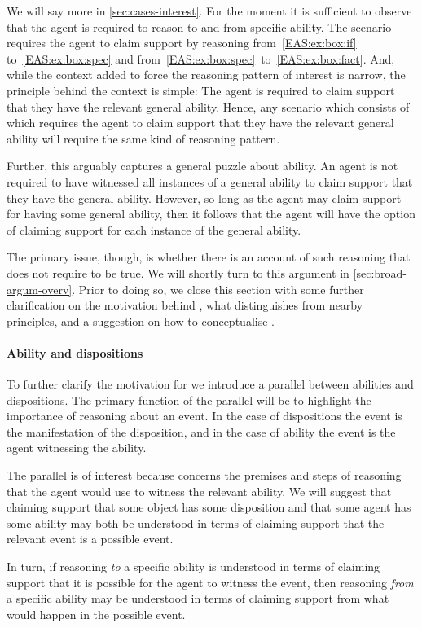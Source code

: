 \begin{note}[Point]
  We will say more in \autoref{sec:cases-interest}.
  For the moment it is sufficient to observe that the agent is required to reason to and from specific ability.
  The scenario requires the agent to claim support by reasoning from~\ref{EAS:ex:box:if} to~\ref{EAS:ex:box:spec} and from~\ref{EAS:ex:box:spec}~to~\ref{EAS:ex:box:fact}.
  And, while the context added to force the reasoning pattern of interest is narrow, the principle behind the context is simple:
  The agent is required to claim support that they have the relevant general ability.
  Hence, any scenario which consists of \gsi{-} which requires the agent to claim support that they have the relevant general ability will require the same kind of reasoning pattern.

  Further, this arguably captures a general puzzle about ability.
  An agent is not required to have witnessed all instances of a general ability to claim support that they have the general ability.
  However, so long as the agent may claim support for having some general ability, then it follows that the agent will have the option of claiming support for each instance of the general ability.

  The primary issue, though, is whether there is an account of such reasoning that does not require \EAS{} to be true.
  We will shortly turn to this argument in \autoref{sec:broad-argum-overv}.
  Prior to doing so, we close this section with some further clarification on the motivation behind \EAS{}, what distinguishes \EAS{} from nearby principles, and a suggestion on how to conceptualise \EAS{}.
\end{note}

\paragraph{Ability and dispositions}

\begin{note}[Parallel]
  To further clarify the motivation for \EAS{} we introduce a parallel between abilities and dispositions.
  The primary function of the parallel will be to highlight the importance of reasoning about an event.
  In the case of dispositions the event is the manifestation of the disposition, and in the case of ability the event is the agent witnessing the ability.

  The parallel is of interest because \EAS{} concerns the premises and steps of reasoning that the agent would use to witness the relevant ability.
  We will suggest that claiming support that some object has some disposition and that some agent has some ability may both be understood in terms of claiming support that the relevant event is a possible event.

  In turn, if reasoning \emph{to} a specific ability is understood in terms of claiming support that it is possible for the agent to witness the event, then reasoning \emph{from} a specific ability may be understood in terms of claiming support from what would happen in the possible event.
  \end{note}

